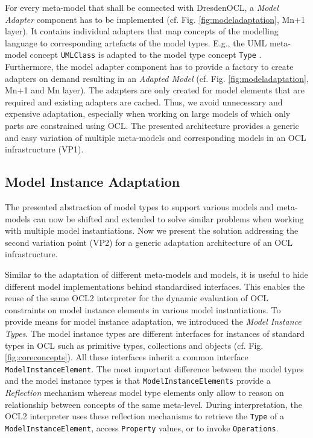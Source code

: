 	For every meta-model that shall be connected with DresdenOCL, 
	a \emph{Model Adapter} component has to be implemented (cf. Fig. \ref{fig:modeladaptation}, Mn+1 layer). 
	It contains individual adapters that map concepts of the modelling
	language to corresponding artefacts of the model types. E.g., the UML
	meta-model concept \texttt{UMLClass} is adapted to the model type concept
	\texttt{Type} . 
	Furthermore, the model adapter component has to provide a factory to create 
	adapters on demand resulting in an \textit{Adapted Model} (cf. Fig.
	\ref{fig:modeladaptation}, Mn+1 and Mn layer).
	The adapters are only created for model elements that are required and
	existing adapters are cached. Thus, we avoid unnecessary and expensive adaptation, 
	especially when working on large models of which only parts are constrained using OCL.
	The presented architecture provides a generic and easy variation of multiple meta-models
	and corresponding models in an OCL infrastructure (VP1).


\subsection{Model Instance Adaptation}
	
	The presented abstraction of model types to support various models
	and meta-models can now be shifted and extended to
	solve similar problems when working with multiple model instantiations. Now we
	present the solution addressing the second variation point (VP2) for a generic adaptation
	architecture of an OCL infrastructure.
	
	Similar to the adaptation of different meta-models and models, it is
	useful to hide different model implementations
	behind standardised interfaces. This enables the
	reuse of the same OCL2 interpreter for the dynamic
	evaluation of OCL constraints on model instance elements in various model
	instantiations. To provide means for model
	instance adaptation, we introduced the \emph{Model Instance
	Types}. The model instance types are different
	interfaces for instances of standard types in OCL such as primitive types, 
	collections and objects (cf. Fig. \ref{fig:coreconcepts}). 
	All these	interfaces inherit a common interface \texttt{ModelInstanceElement}. The most 
	important difference between the model types and the model instance types
	is that \texttt{ModelInstanceElements} provide a \emph{Reflection} \cite{maesOOPSLA87} mechanism whereas 
	model type elements only allow to reason on relationship between concepts of
	the same meta-level. During interpretation, the OCL2 interpreter uses these reflection mechanisms to
	retrieve the \texttt{Type} of a \texttt{ModelInstanceElement}, access \texttt{Property}
	values, or to invoke \texttt{Operations}.
	
